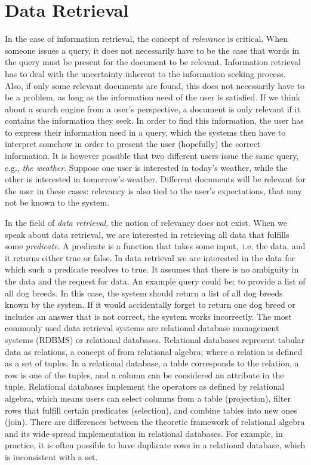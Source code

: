 \section{Data Retrieval}
In the case of information retrieval, the concept of \emph{relevance} is critical. When someone issues a query, it does not necessarily have to be the case that words in the query must be present for the document to be relevant. Information retrieval has to deal with the uncertainty inherent to the information seeking process. Also, if only some relevant documents are found, this does not necessarily have to be a problem, as long as the information need of the user is satisfied. If we think about a search engine from a user's perspective, a document is only relevant if it contains the information they seek. In order to find this information, the user has to express their information need in a query, which the systems then have to interpret somehow in order to present the user (hopefully) the correct information. 
It is however possible that two different users issue the same query, e.g., \emph{the weather}. Suppose one user is interested in today's weather, while the other is interested in tomorrow's weather. Different documents will be relevant for the user in these cases: relevancy is also tied to the user's expectations, that may not be known to the system.

In the field of \emph{data retrieval}, the notion of relevancy does not exist. When we speak about data retrieval, we are interested in retrieving all data that fulfills some \emph{predicate}. A predicate is a function that takes some input,\ i.e. the data, and it returns either true or false. In data retrieval we are interested in the data for which such a predicate resolves to true. It assumes that there is no ambiguity in the data and the request for data. An example query could be; to provide a list of all dog breeds. In this case, the system should return a list of all dog breeds known by the system. If it would accidentally forget to return one dog breed or includes an answer that is not correct, the system works incorrectly. 
The most commonly used data retrieval systems are relational database management systems (RDBMS) or relational databases. Relational databases represent tabular data as relations, a concept of from relational algebra; where a relation is defined as a set of tuples. In a relational database, a table corresponds to the relation, a row is one of the tuples, and a column can be considered an attribute in the tuple. Relational databases implement the operators as defined by relational algebra, which means users can select columns from a table (projection), filter rows that fulfill certain predicates (selection), and combine tables into new ones (join). There are differences between the theoretic framework of relational algebra and its wide-spread implementation in relational databases. For example, in practice, it is often possible to have duplicate rows in a relational database, which is inconsistent with a set. 

